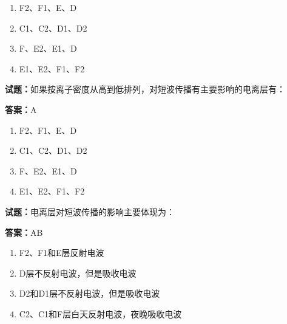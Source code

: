 \documentclass{ctexbook}
\begin{document}
\begin{enumerate}[leftmargin=3em]
  \item F2、F1、E、D 

  \item C1、C2、D1、D2 

  \item F、E2、E1、D 

  \item E1、E2、F1、F2 

\end{enumerate}





\vspace{1em}

\textbf{试题：}如果按离子密度从高到低排列，对短波传播有主要影响的电离层有： 

\textbf{答案：}A 


\begin{enumerate}[leftmargin=3em]
  \item F2、F1、E、D 

  \item C1、C2、D1、D2 

  \item F、E2、E1、D 

  \item E1、E2、F1、F2 

\end{enumerate}





\vspace{1em}

\textbf{试题：}电离层对短波传播的影响主要体现为： 

\textbf{答案：}AB 

\begin{enumerate}[leftmargin=3em]
  \item F2、F1和E层反射电波 

  \item D层不反射电波，但是吸收电波 

  \item D2和D1层不反射电波，但是吸收电波 

  \item C2、C1和F层白天反射电波，夜晚吸收电波 

\end{enumerate}
\end{document}
